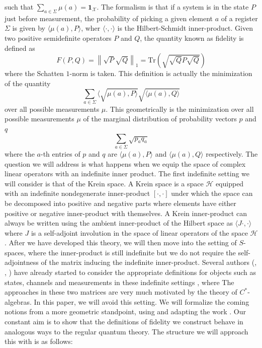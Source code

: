 \documentclass{amsart}
\numberwithin{equation}{section}
\theoremstyle{definition}
\theoremstyle{plain}
\theoremstyle{solutionstyle}
\begin{document}
 such that $\sum_{a\in\Sigma}\mu(a)=\mathbf{1}_{\mathcal{X}}$. The formalism is that if a system is in the state $P$ just before measurement, the probability of picking a given element $a$ of a register $\Sigma$ is given by $\langle \mu(a), P\rangle$, wher $\langle\cdot,\cdot\rangle$ is the Hilbert-Schmidt inner-product. Given two positive semidefinite operators $P$ and $Q$, the quantity known as fidelity is defined as 
\begin{equation*}
    F(P,Q)=\left\|\sqrt{P}\sqrt{Q}\right\|_1=\mathrm{Tr}\left(\sqrt{\sqrt{Q}P\sqrt{Q}}\right)
\end{equation*} where the Schatten $1$-norm is taken. This definition is actually the minimization of the quantity 
\begin{equation*}
    \sum_{a\in\Sigma}\langle \sqrt{\mu(a),P\rangle}\sqrt{\langle \mu(a),Q\rangle} 
\end{equation*}
over all possible measurements $\mu$. This geometrically is the minimization over all possible measurements $\mu$ of the marginal distribution of probability vectors $p$ and $q$
\begin{equation*}
    \sum_{a\in \Sigma}\sqrt{p_aq_a}
\end{equation*}
where the $a$-th entries of $p$ and $q$ are $\langle \mu(a),P\rangle$ and $\langle \mu(a),Q\rangle$ respectively.
The question we will address is what happens when we equip the space of complex linear operators with an indefinite inner product. The first indefinite setting we will consider is that of the Krein space. A Krein space is a space $\mathcal{H}$ equipped with an indefinite nondegenerate inner-product $[ \cdot,\cdot]$ under which the space can be decomposed into positive and negative parts where elements have either positive or negative inner-product with themselves. A Krein inner-product can always be written using the ambient inner-product of the Hilbert space as $\langle J\cdot,\cdot \rangle$ where $J$ is a self-adjoint involution in the space of linear operators of the space $\mathcal{H}$. After we have developed this theory, we will then move into the setting of $S$-spaces, where the inner-product is still indefinite but we do not require the self-adjointness of the matrix inducing the indefinite inner-product. Several authors (\cite{FelipeSosa2022}, \cite{bag2024quantumuchannelssspaces}, \cite{Heo2022}) have already started to consider the appropriate definitions for objects such as states, channels and measurements in these indefinite settings , where  The approaches in these two matrices are very much motivated by the theory of $C^*$-algebras. In this paper, we will avoid this setting. We will formalize the coming notions from a more geometric standpoint, using and adapting the work \cite{franco2026conejhermitianmatricesgeometric}. Our constant aim is to show that the definitions of fidelity we construct behave in analogous ways to the regular quantum theory. The structure we will approach this with is as follows: 
\end{document}
